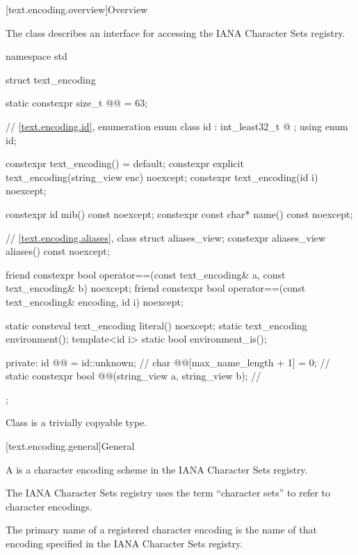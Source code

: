 [text.encoding.overview]{Overview}

\pnum
The class  describes an interface
for accessing the IANA Character Sets registry\supercite{iana-charset}.

%
\begin{codeblock}
namespace std {
  struct text_encoding {
    static constexpr size_t @@ = 63;

    // \ref{text.encoding.id}, enumeration 
    enum class id : int_least32_t {
      @\seebelow@
    };
    using enum id;

    constexpr text_encoding() = default;
    constexpr explicit text_encoding(string_view enc) noexcept;
    constexpr text_encoding(id i) noexcept;

    constexpr id mib() const noexcept;
    constexpr const char* name() const noexcept;

    // \ref{text.encoding.aliases}, class 
    struct aliases_view;
    constexpr aliases_view aliases() const noexcept;

    friend constexpr bool operator==(const text_encoding& a,
                                     const text_encoding& b) noexcept;
    friend constexpr bool operator==(const text_encoding& encoding, id i) noexcept;

    static consteval text_encoding literal() noexcept;
    static text_encoding environment();
    template<id i> static bool environment_is();

  private:
    id @@ = id::unknown;                                              // \expos
    char @@[max_name_length + 1] = {0};                              // \expos
    static constexpr bool @@(string_view a, string_view b);      // \expos
  };
}
\end{codeblock}

\pnum
Class  is
a trivially copyable type.

[text.encoding.general]{General}

\pnum
A  is
a character encoding scheme in the IANA Character Sets registry.
\begin{note}
The IANA Character Sets registry uses the term ``character sets''
to refer to character encodings.
\end{note}
The primary name of a registered character encoding is
the name of that encoding specified in the IANA Character Sets registry.

